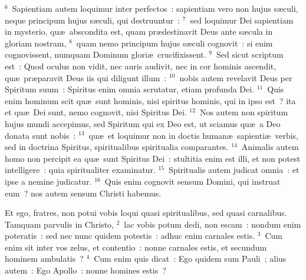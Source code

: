 ${}^{6}$~Sapientiam autem loquimur inter perfectos~: sapientiam vero non hujus s\ae culi, neque principum hujus s\ae culi, qui destruuntur~:
${}^{7}$~sed loquimur Dei sapientiam in mysterio, qu\ae\ abscondita est, quam pr\ae destinavit Deus ante s\ae cula in gloriam nostram,
${}^{8}$~quam nemo principum hujus s\ae culi cognovit~: si enim cognovissent, numquam Dominum glori\ae\ crucifixissent.
${}^{9}$~Sed sicut scriptum est~: Quod oculus non vidit, nec auris audivit, nec in cor hominis ascendit, qu\ae\ pr\ae paravit Deus iis qui diligunt illum~:
${}^{10}$~nobis autem revelavit Deus per Spiritum suum~: Spiritus enim omnia scrutatur, etiam profunda Dei.
${}^{11}$~Quis enim hominum scit qu\ae\ sunt hominis, nisi spiritus hominis, qui in ipso est~? ita et qu\ae\ Dei sunt, nemo cognovit, nisi Spiritus Dei.
${}^{12}$~Nos autem non spiritum hujus mundi accepimus, sed Spiritum qui ex Deo est, ut sciamus qu\ae\ a Deo donata sunt nobis~:
${}^{13}$~qu\ae\ et loquimur non in doctis human\ae\ sapienti\ae\ verbis, sed in doctrina Spiritus, spiritualibus spiritualia comparantes.
${}^{14}$~Animalis autem homo non percipit ea qu\ae\ sunt Spiritus Dei~: stultitia enim est illi, et non potest intelligere~: quia spiritualiter examinatur.
${}^{15}$~Spiritualis autem judicat omnia~: et ipse a nemine judicatur.
${}^{16}$~Quis enim cognovit sensum Domini, qui instruat eum~? nos autem sensum Christi habemus.

\lettrine[lines=3,image=true,loversize=0.05,lraise=-0.03]{E}{}t ego, fratres, non potui vobis loqui quasi spiritualibus, sed quasi carnalibus. Tamquam parvulis in Christo,
${}^{2}$~lac vobis potum dedi, non escam~: nondum enim poteratis~: sed nec nunc quidem potestis~: adhuc enim carnales estis.
${}^{3}$~Cum enim sit inter vos zelus, et contentio~: nonne carnales estis, et secundum hominem ambulatis~?
${}^{4}$~Cum enim quis dicat~: Ego quidem sum Pauli~; alius autem~: Ego Apollo~: nonne homines estis~?

